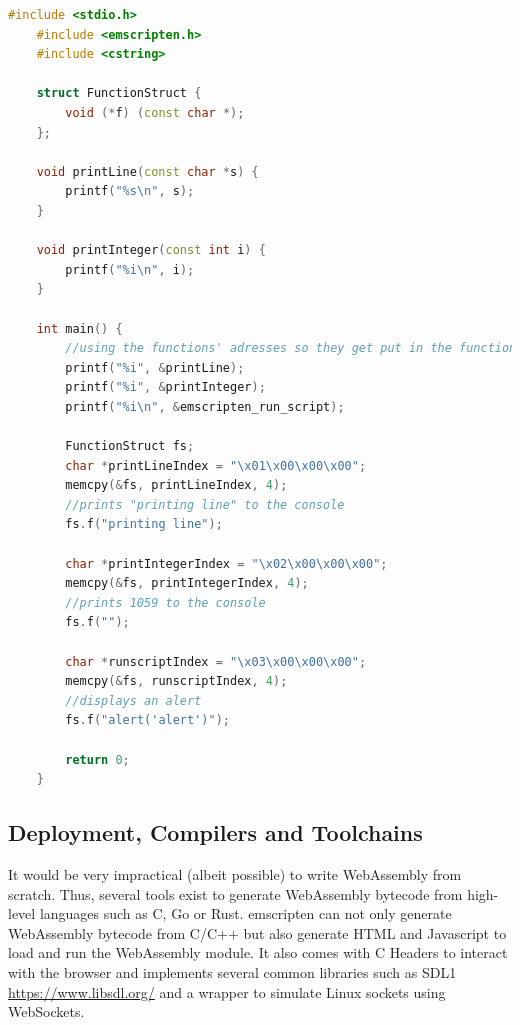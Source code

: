 \documentclass[sigconf]{acmart}
\begin{document}
\begin{lstlisting}[language=C++, caption={Example demonstrating how function pointer type checking works. Even though \texttt{FunctionStruct} has function \texttt{f} as a member which expects a pointer to a \texttt{char}, it can be overwritten with the index of a function which expects a 32-bit integer. This is due to both pointers and 32-bit integers being represented by the same datatype in WebAssembly, namely \texttt{i32}}, label={lst:wasm_function_type_checking}]
	#include <stdio.h>
	#include <emscripten.h>
	#include <cstring>

	struct FunctionStruct {
		void (*f) (const char *);
	};

	void printLine(const char *s) {
		printf("%s\n", s);
	}

	void printInteger(const int i) {
		printf("%i\n", i);
	}

	int main() {	
		//using the functions' adresses so they get put in the function table
		printf("%i", &printLine);
		printf("%i", &printInteger);
		printf("%i\n", &emscripten_run_script);
		
		FunctionStruct fs;
		char *printLineIndex = "\x01\x00\x00\x00";
		memcpy(&fs, printLineIndex, 4);
		//prints "printing line" to the console
		fs.f("printing line"); 
		
		char *printIntegerIndex = "\x02\x00\x00\x00";
		memcpy(&fs, printIntegerIndex, 4);
		//prints 1059 to the console
		fs.f("");
		
		char *runscriptIndex = "\x03\x00\x00\x00";
		memcpy(&fs, runscriptIndex, 4);
		//displays an alert
		fs.f("alert('alert')");		
		
		return 0;
	}
\end{lstlisting}

\subsection{Deployment, Compilers and Toolchains}
It would be very impractical (albeit possible) to write WebAssembly from scratch. Thus, several tools exist to generate WebAssembly bytecode from high-level languages such as C, Go or Rust. emscripten can not only generate WebAssembly bytecode from C/C++ but also generate HTML and Javascript to load and run the WebAssembly module. It also comes with C Headers to interact with the browser and implements several common libraries such as SDL1 \url{https://www.libsdl.org/} and a wrapper to simulate Linux sockets using WebSockets.  
\end{document}
